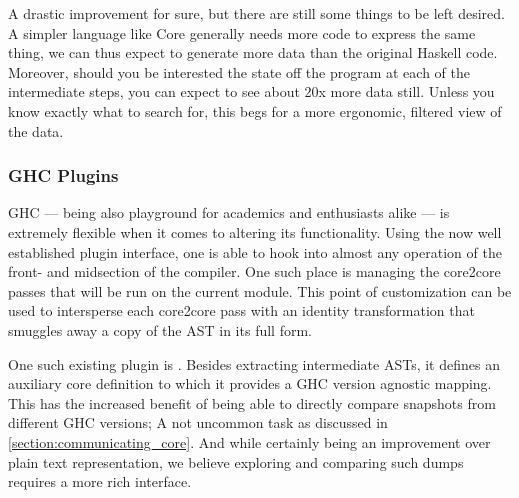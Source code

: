 A drastic improvement for sure, but there are still some things to be left desired.
A simpler language like Core generally needs more code to express the same thing, we can thus expect
to generate more data than the original Haskell code. Moreover, should you be interested the state off
the program at each of the intermediate steps, you can expect to see about 20x more data still.
Unless you know exactly what to search for, this begs for a more ergonomic, filtered view of the data.

\subsubsection{GHC Plugins}

GHC --- being also playground for academics and enthusiasts alike --- is extremely flexible when it comes to
altering its functionality. Using the now well established plugin interface, one is able to hook into almost
any operation of the front- and midsection of the compiler. One such place is managing the core2core passes that
will be run on the current module. This point of customization can be used to intersperse each core2core pass with an
identity transformation that smuggles away a copy of the AST in its full form.

One such existing plugin is  \cite{ghc_dump}. Besides extracting intermediate ASTs, it defines an
auxiliary core definition to which it provides a GHC version agnostic mapping. This has the increased benefit of 
being able to directly compare snapshots from different GHC versions; A not uncommon task as discussed in \cref{section:communicating_core}.
And while certainly being an improvement over plain text representation, we believe exploring and comparing such
dumps requires a more rich interface.
